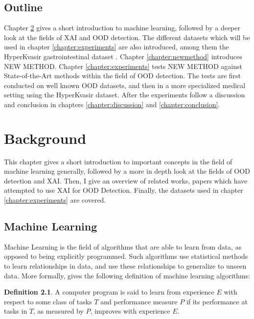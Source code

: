 \documentclass[UKenglish]{uiomasterthesis} %
\theoremstyle{definition}
\newtheorem*{definition}{Definition}
\begin{document}
\section{Outline}

Chapter \ref{chapter:background} gives a short introduction to machine learning, followed by a deeper look at the fields of XAI and OOD detection. The different datasets which will be used in chapter \ref{chapter:experiments} are also introduced, among them the HyperKvasir gastrointestinal dataset \cite{hyperkvasir}. Chapter \ref{chapter:newmethod} introduces NEW METHOD. Chapter \ref{chapter:experiments} tests NEW METHOD against State-of-the-Art methods within the field of OOD detection. The tests are first conducted on well known OOD datasets, and then in a more specialized medical setting using the HyperKvasir dataset. After the experiments follow a discussion and conclusion in chapters \ref{chapter:discussion} and \ref{chapter:conclusion}.

\chapter{Background} \label{chapter:background}

This chapter gives a short introduction to important concepts in the field of machine learning generally, followed by a more in depth look at the fields of OOD detection and XAI. Then, I give an overview of related works, papers which have attempted to use XAI for OOD Detection. Finally, the datasets used in chapter \ref{chapter:experiments} are covered. 

\section{Machine Learning}

Machine Learning is the field of algorithms that are able to learn from data, as opposed to being explicitly programmed. Such algorithms use statistical methods to learn relationships in data, and use these relationships to generalize to unseen data. More formally, \cite{mitchell} gives the following definition of machine learning algorithms:

\begin{definition}
A computer program is said to learn from experience $E$ with respect to some class of tasks $T$ and performance measure $P$ if its performance at tasks in $T$, as measured by $P$, improves with experience $E$.
\end{definition}
\end{document}
